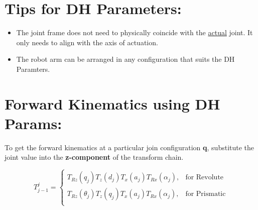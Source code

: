 \documentclass[12px]{article}
\begin{document}
\section*{Tips for DH Parameters:}

\begin{itemize}
    \item The joint frame does not need to physically coincide with the \underline{actual} joint. It only needs to align with the axis of actuation.
    \item The robot arm can be arranged in any configuration that suits the DH Paramters.
\end{itemize}


\section*{Forward Kinematics using DH Params:}

To get the forward kinematics at a particular join configuration \textbf{q}, substitute the joint value into the \textbf{z-component} of the transform chain.

$$
T^{j}_{j-1} =
\begin{cases}
    T_{Rz}(q_j)T_{z}(d_j)T_{x}(a_j)T_{Rx}(\alpha_j) , & \text{for Revolute} \\
    T_{Rz}(\theta_j)T_{z}(q_j)T_{x}(a_j)T_{Rx}(\alpha_j) , & \text{for Prismatic} \\
\end{cases}
$$
\end{document}
